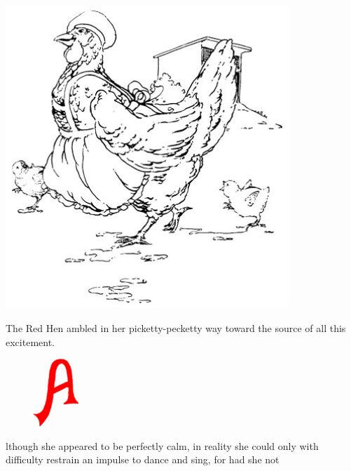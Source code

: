 \documentclass[letterpaper, 10pt, openany]{memoir}
\begin{document}
\newpage
\begin{center}
	\includegraphics[width=0.8\textwidth]{image_037.jpg}
\end{center}
The Red Hen ambled in her picketty-pecketty way toward the source of all this excitement.

\newpage
\begin{figure}
	\includegraphics[width=0.15\textwidth]{image_005_1.jpg}
\end{figure}
lthough she appeared to be perfectly calm, in reality she could only with difficulty restrain an
impulse to dance and sing, for had she not
\end{document}
